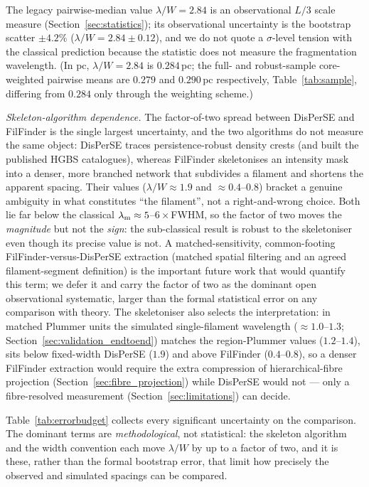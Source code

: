 \documentclass[usenatbib,twoside,twocolumn]{mnras}
\begin{document}
The legacy pairwise-median value $\lambda/W=2.84$ is an observational $L/3$ scale measure (Section~\ref{sec:statistics}); its observational uncertainty is the bootstrap scatter $\pm4.2\%$ ($\lambda/W=2.84\pm0.12$), and we do not quote a $\sigma$-level tension with the classical prediction because the statistic does not measure the fragmentation wavelength. (In pc, $\lambda/W=2.84$ is $0.284$\,pc; the full- and robust-sample core-weighted pairwise means are $0.279$ and $0.290$\,pc respectively, Table~\ref{tab:sample}, differing from $0.284$ only through the weighting scheme.)

\emph{Skeleton-algorithm dependence.} The factor-of-two spread between DisPerSE and FilFinder is the single largest uncertainty, and the two algorithms do not measure the same object: DisPerSE traces persistence-robust density crests (and built the published HGBS catalogues), whereas FilFinder skeletonises an intensity mask into a denser, more branched network that subdivides a filament and shortens the apparent spacing. Their values ($\lambda/W\approx1.9$ and $\approx0.4$--$0.8$) bracket a genuine ambiguity in what constitutes ``the filament'', not a right-and-wrong choice. Both lie far below the classical $\lambda_{\rm m}\approx5$--$6\times$FWHM, so the factor of two moves the \emph{magnitude} but not the \emph{sign}: the sub-classical result is robust to the skeletoniser even though its precise value is not. A matched-sensitivity, common-footing FilFinder-versus-DisPerSE extraction (matched spatial filtering and an agreed filament-segment definition) is the important future work that would quantify this term; we defer it and carry the factor of two as the dominant open observational systematic, larger than the formal statistical error on any comparison with theory. The skeletoniser also selects the interpretation: in matched Plummer units the simulated single-filament wavelength ($\approx1.0$--$1.3$; Section~\ref{sec:validation_endtoend}) matches the region-Plummer values ($1.2$--$1.4$), sits below fixed-width DisPerSE ($1.9$) and above FilFinder ($0.4$--$0.8$), so a denser FilFinder extraction would require the extra compression of hierarchical-fibre projection (Section~\ref{sec:fibre_projection}) while DisPerSE would not --- only a fibre-resolved measurement (Section~\ref{sec:limitations}) can decide.

Table~\ref{tab:errorbudget} collects every significant uncertainty on the comparison. The dominant terms are \emph{methodological}, not statistical: the skeleton algorithm and the width convention each move $\lambda/W$ by up to a factor of two, and it is these, rather than the formal bootstrap error, that limit how precisely the observed and simulated spacings can be compared.
\end{document}
